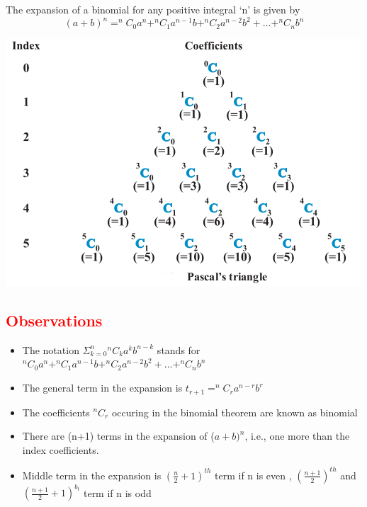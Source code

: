 \documentclass{article}
\begin{document}
\begin{multicols}{2}
The expansion of a binomial for any positive integral ‘n’ is given by
$$(a+b)^n=^nC_0 a^n+ ^nC_1 a^{n-1}b+^nC_2 a^{n-2}b^2+\dots + ^nC_n b^n$$

\includegraphics[scale=0.5]{1.png}




\subsection*{\large \textcolor{red}{Observations}}
\begin{itemize}
    \item The notation $\Sigma_{k=0}^n {^nC_k} a^k b^{n-k}$  stands for $^nC_0 a^n+ ^nC_1 a^{n-1}b+^nC_2 a^{n-2}b^2+\dots + ^nC_n b^n$
    \item The general term in the expansion is $t_{r+1} = ^nC_r a^{n-r} b^r$
    \item The coefficients $^nC_r$ occuring in the binomial theorem are known as binomial
    \item There are (n+1) terms in the expansion of ($a+b)^n$, i.e., one more than the index
coefficients.
\item Middle term in the expansion is $\left(\frac{n}{2}+1\right)^{t h}$ term if n is even , $\left(\frac{n+1}{2}\right)^{t h}$ and $\left(\frac{n+1}{2}+1\right)^{b_{t}}$ term if n is odd 
\end{itemize}


\end{multicols}
\end{document}
